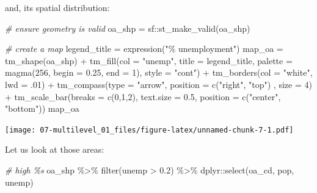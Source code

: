 \documentclass[
]{book}
\newenvironment{Shaded}{\begin{snugshade}}{\end{snugshade}}
\newcommand{\AttributeTok}[1]{\textcolor[rgb]{0.77,0.63,0.00}{#1}}
\newcommand{\CommentTok}[1]{\textcolor[rgb]{0.56,0.35,0.01}{\textit{#1}}}
\newcommand{\DecValTok}[1]{\textcolor[rgb]{0.00,0.00,0.81}{#1}}
\newcommand{\FloatTok}[1]{\textcolor[rgb]{0.00,0.00,0.81}{#1}}
\newcommand{\FunctionTok}[1]{\textcolor[rgb]{0.00,0.00,0.00}{#1}}
\newcommand{\NormalTok}[1]{#1}
\newcommand{\OtherTok}[1]{\textcolor[rgb]{0.56,0.35,0.01}{#1}}
\newcommand{\SpecialCharTok}[1]{\textcolor[rgb]{0.00,0.00,0.00}{#1}}
\newcommand{\StringTok}[1]{\textcolor[rgb]{0.31,0.60,0.02}{#1}}
\begin{document}
and, its spatial distribution:

\begin{Shaded}
\begin{Highlighting}[]
\CommentTok{\# ensure geometry is valid}
\NormalTok{oa\_shp }\OtherTok{=}\NormalTok{ sf}\SpecialCharTok{::}\FunctionTok{st\_make\_valid}\NormalTok{(oa\_shp)}

\CommentTok{\# create a map}
\NormalTok{legend\_title }\OtherTok{=} \FunctionTok{expression}\NormalTok{(}\StringTok{"\% unemployment"}\NormalTok{)}
\NormalTok{map\_oa }\OtherTok{=} \FunctionTok{tm\_shape}\NormalTok{(oa\_shp) }\SpecialCharTok{+}
  \FunctionTok{tm\_fill}\NormalTok{(}\AttributeTok{col =} \StringTok{"unemp"}\NormalTok{, }\AttributeTok{title =}\NormalTok{ legend\_title, }\AttributeTok{palette =} \FunctionTok{magma}\NormalTok{(}\DecValTok{256}\NormalTok{, }\AttributeTok{begin =} \FloatTok{0.25}\NormalTok{, }\AttributeTok{end =} \DecValTok{1}\NormalTok{), }\AttributeTok{style =} \StringTok{"cont"}\NormalTok{) }\SpecialCharTok{+} 
  \FunctionTok{tm\_borders}\NormalTok{(}\AttributeTok{col =} \StringTok{"white"}\NormalTok{, }\AttributeTok{lwd =}\NormalTok{ .}\DecValTok{01}\NormalTok{)  }\SpecialCharTok{+} 
  \FunctionTok{tm\_compass}\NormalTok{(}\AttributeTok{type =} \StringTok{"arrow"}\NormalTok{, }\AttributeTok{position =} \FunctionTok{c}\NormalTok{(}\StringTok{"right"}\NormalTok{, }\StringTok{"top"}\NormalTok{) , }\AttributeTok{size =} \DecValTok{4}\NormalTok{) }\SpecialCharTok{+} 
  \FunctionTok{tm\_scale\_bar}\NormalTok{(}\AttributeTok{breaks =} \FunctionTok{c}\NormalTok{(}\DecValTok{0}\NormalTok{,}\DecValTok{1}\NormalTok{,}\DecValTok{2}\NormalTok{), }\AttributeTok{text.size =} \FloatTok{0.5}\NormalTok{, }\AttributeTok{position =}  \FunctionTok{c}\NormalTok{(}\StringTok{"center"}\NormalTok{, }\StringTok{"bottom"}\NormalTok{)) }
\NormalTok{map\_oa}
\end{Highlighting}
\end{Shaded}

\texttt{[image: 07-multilevel\_01\_files/figure-latex/unnamed-chunk-7-1.pdf]}

Let us look at those areas:

\begin{Shaded}
\begin{Highlighting}[]
\CommentTok{\# high \%s}
\NormalTok{oa\_shp }\SpecialCharTok{\%\textgreater{}\%} \FunctionTok{filter}\NormalTok{(unemp }\SpecialCharTok{\textgreater{}} \FloatTok{0.2}\NormalTok{) }\SpecialCharTok{\%\textgreater{}\%} 
\NormalTok{  dplyr}\SpecialCharTok{::}\FunctionTok{select}\NormalTok{(oa\_cd, pop, unemp) }
\end{Highlighting}
\end{Shaded}
\end{document}
